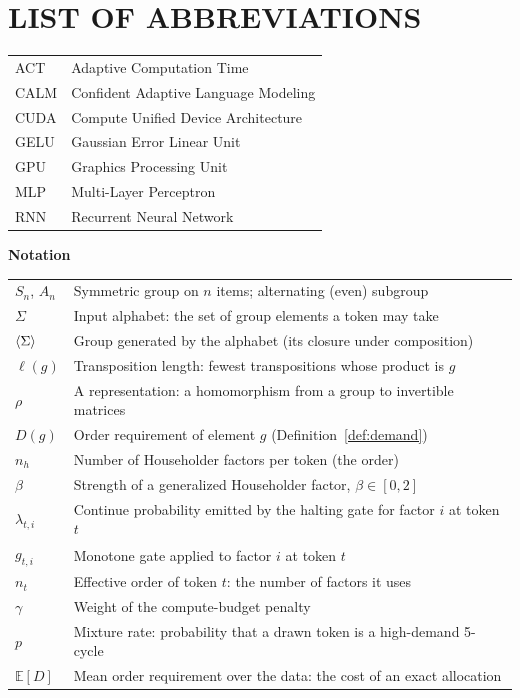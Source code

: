 \chapter*{\centering LIST OF ABBREVIATIONS}
\begingroup\renewcommand{\arraystretch}{0.85}
\begin{tabular}{p{3.2cm} p{10.6cm}}
ACT      & Adaptive Computation Time \\
CALM     & Confident Adaptive Language Modeling \\
CUDA     & Compute Unified Device Architecture \\
GELU     & Gaussian Error Linear Unit \\
GPU      & Graphics Processing Unit \\
MLP      & Multi-Layer Perceptron \\
RNN      & Recurrent Neural Network \\
\end{tabular}

\vspace{0.6em}
\noindent\textbf{Notation}

\noindent
\begin{tabular}{p{3.2cm} p{10.6cm}}
$S_n$, $A_n$     & Symmetric group on $n$ items; alternating (even) subgroup \\
$\Sigma$         & Input alphabet: the set of group elements a token may take \\
$\langle \Sigma \rangle$   & Group generated by the alphabet (its closure under composition) \\
$\ell(g)$        & Transposition length: fewest transpositions whose product is $g$ \\
$\rho$           & A representation: a homomorphism from a group to invertible matrices \\
$D(g)$           & Order requirement of element $g$ (Definition~\ref{def:demand}) \\
$n_h$            & Number of Householder factors per token (the order) \\
$\beta$          & Strength of a generalized Householder factor, $\beta\in[0,2]$ \\
$\lambda_{t,i}$  & Continue probability emitted by the halting gate for factor $i$ at token $t$ \\
$g_{t,i}$        & Monotone gate applied to factor $i$ at token $t$ \\
$n_t$            & Effective order of token $t$: the number of factors it uses \\
$\gamma$         & Weight of the compute-budget penalty \\
$p$              & Mixture rate: probability that a drawn token is a high-demand 5-cycle \\
$\mathbb{E}[D]$  & Mean order requirement over the data: the cost of an exact allocation \\
\end{tabular}
\endgroup
\clearpage
